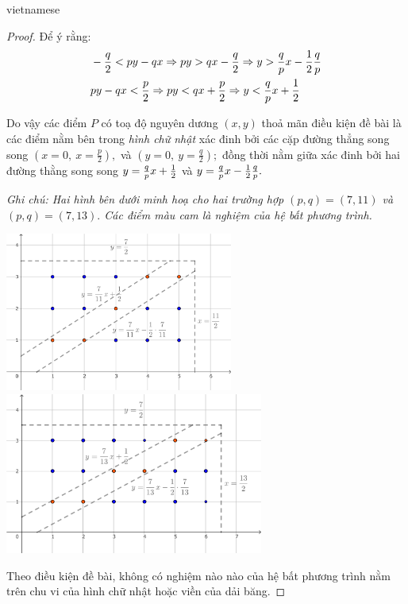 \documentclass{article}
\begin{document}
\begin{otherlanguage*}{vietnamese}
\begin{proof}
    Để ý rằng:
    \[
        \begin{aligned}
            &-\frac{q}{2} < py - qx \Rightarrow py > qx - \frac{q}{2} \Rightarrow y > \frac{q}{p} x - \frac{1}{2} \frac{q}{p}\\
            &py - qx < \frac{p}{2} \Rightarrow py < qx + \frac{p}{2} \Rightarrow y < \frac{q}{p} x + \frac{1}{2}
        \end{aligned}
    \]

    Do vậy các điểm $P$ có toạ độ nguyên dương $(x,y)$ thoả mãn điều kiện đề bài là các điểm nằm bên trong \textit{hình chữ nhật}
    xác đinh bởi các cặp đường thẳng song song $(x = 0,\ x = \frac{p}{2}),$ và $(y=0,\ y=\frac{q}{2});$
    đồng thời nằm giữa  xác đinh bởi hai đường thằng song song $y = \frac{q}{p} x + \frac{1}{2}$ và $y = \frac{q}{p} x - \frac{1}{2} \frac{q}{p}.$

    \textit{Ghi chú: Hai hình bên dưới minh hoạ cho hai trường hợp $(p,q) = (7,11)$ và $(p,q) = (7,13).$ 
    Các điểm màu cam là nghiệm của hệ bất phương trình.}
    \begin{center}
        \includegraphics[width=7.5cm]{./svg/pdf/pi-2025-1-p3.pdf}
        \quad
        \includegraphics[width=8.5cm]{./svg/pdf/pi-2025-1-p3-2.pdf}
    \end{center}

    Theo điều kiện đề bài, không có nghiệm nào nào của hệ bất phương trình nằm trên chu vi của hình chữ nhật hoặc viền của dải băng.


\end{proof}
\end{otherlanguage*}
\end{document}
